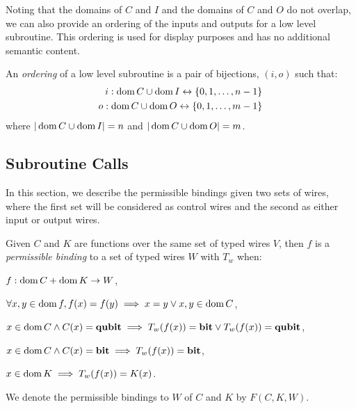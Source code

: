 Noting that the domains of $C$ and $I$ and the domains of $C$ and $O$ do
not overlap, we can also provide an ordering of the inputs and outputs for
a low level subroutine. This ordering is used for display purposes and
has no additional semantic content.

\begin{definition}\label{def:low_level_subroutine_ordering}
  An \emph{ordering} of a low level subroutine is a pair of bijections,
  $(i,o)$ such that:
  \begin{align}
    i: \operatorname*{dom} C \cup \operatorname*{dom} I \leftrightarrow \{0,1,\ldots,n-1\}\\
    o: \operatorname*{dom} C \cup \operatorname*{dom} O \leftrightarrow \{0,1,\ldots,m-1\}
  \end{align}
  where $|\operatorname*{dom} C \cup \operatorname*{dom} I| = n$ and $|\operatorname*{dom} C \cup \operatorname*{dom} O| = m$.
\end{definition}



\subsection{Subroutine Calls} %
\label{sub:subroutine_calls}

In this section, we describe the permissible bindings given two
sets of wires, where the first set will be considered as control wires and
the second as either input or output wires.
\begin{definition}\label{def:permissible_bindings}
  Given $C$ and $K$ are 
  functions over the same set of typed wires $V$,
  then $f$ is a \emph{permissible binding} to a
  set of typed wires $W$ with  $T_w$ when:
  \bi
  \item $f: \operatorname*{dom} C + \operatorname*{dom} K \to W$,
  \item $\forall x, y\in \operatorname*{dom} f, f(x)=f(y) \implies x=y \vee x,y\in \operatorname*{dom} C$,
  \item $x\in \operatorname*{dom} C \wedge C(x) = \mathbf{{qubit}}
  \implies T_w(f(x)) = \mathbf{{bit}} \vee T_w(f(x)) = \mathbf{{qubit}}$,
  \item $x\in \operatorname*{dom} C \wedge C(x) = \mathbf{{bit}} \implies T_w(f(x)) = \mathbf{{bit}}$,
  \item $x\in \operatorname*{dom} K  \implies T_w(f(x)) = K(x)$.
  \ei
\end{definition}

We denote the permissible bindings to $W$ of $C$ and $K$ by $F(C,K,W)$.

